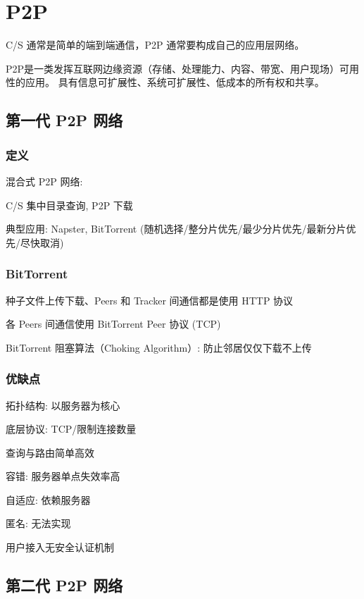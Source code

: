 \documentclass[UTF8,cs4size]{ctexart}
\begin{document}
\section{P2P}
C/S 通常是简单的端到端通信，P2P 通常要构成自己的应用层网络。

P2P是一类发挥互联网边缘资源（存储、处理能力、内容、带宽、用户现场）可用性的应用。
具有信息可扩展性、系统可扩展性、低成本的所有权和共享。
\subsection{第一代 P2P 网络}
\subsubsection{定义}
混合式 P2P 网络:
\begin{compactitem}
  \item C/S 集中目录查询, P2P 下载
  \item 典型应用: Napster, BitTorrent (随机选择/整分片优先/最少分片优先/最新分片优先/尽快取消)
\end{compactitem}
\subsubsection{BitTorrent}
\begin{compactitem}
  \item 种子文件上传下载、Peers 和 Tracker 间通信都是使用 HTTP 协议
  \item 各 Peers 间通信使用 BitTorrent Peer 协议 (TCP)
  \item BitTorrent 阻塞算法（Choking Algorithm）: 防止邻居仅仅下载不上传
\end{compactitem}
\subsubsection{优缺点}
\begin{compactitem}
  \item 拓扑结构: 以服务器为核心
  \item 底层协议: TCP/限制连接数量
  \item 查询与路由简单高效
  \item 容错: 服务器单点失效率高
  \item 自适应: 依赖服务器
  \item 匿名: 无法实现
  \item 用户接入无安全认证机制
\end{compactitem}
\subsection{第二代 P2P 网络}
\end{document}
